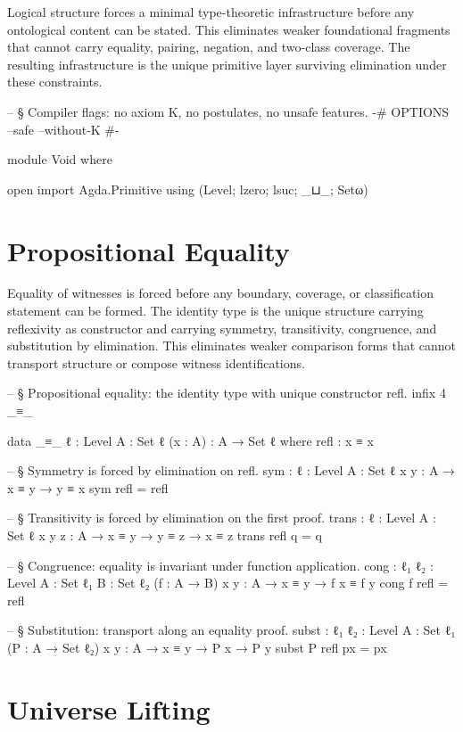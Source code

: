 \documentclass[11pt,a4paper]{book}
\begin{document}
Logical structure forces a minimal type-theoretic infrastructure before any ontological content can be stated.
This eliminates weaker foundational fragments that cannot carry equality, pairing, negation, and two-class coverage.
The resulting infrastructure is the unique primitive layer surviving elimination under these constraints.

\begin{code}
-- § Compiler flags: no axiom K, no postulates, no unsafe features.
{-# OPTIONS --safe --without-K #-}

module Void where

open import Agda.Primitive using (Level; lzero; lsuc; _⊔_; Setω)
\end{code}

\section{Propositional Equality}

Equality of witnesses is forced before any boundary, coverage, or classification statement can be formed.
The identity type is the unique structure carrying reflexivity as constructor and carrying symmetry, transitivity, congruence, and substitution by elimination.
This eliminates weaker comparison forms that cannot transport structure or compose witness identifications.

\begin{code}
-- § Propositional equality: the identity type with unique constructor refl.
infix 4 _≡_

data _≡_ {ℓ : Level} {A : Set ℓ} (x : A) : A → Set ℓ where
  refl : x ≡ x

-- § Symmetry is forced by elimination on refl.
sym : {ℓ : Level} {A : Set ℓ} {x y : A} → x ≡ y → y ≡ x
sym refl = refl

-- § Transitivity is forced by elimination on the first proof.
trans : {ℓ : Level} {A : Set ℓ} {x y z : A} → x ≡ y → y ≡ z → x ≡ z
trans refl q = q

-- § Congruence: equality is invariant under function application.
cong : {ℓ₁ ℓ₂ : Level} {A : Set ℓ₁} {B : Set ℓ₂} (f : A → B) {x y : A} → x ≡ y → f x ≡ f y
cong f refl = refl

-- § Substitution: transport along an equality proof.
subst : {ℓ₁ ℓ₂ : Level} {A : Set ℓ₁} (P : A → Set ℓ₂) {x y : A} → x ≡ y → P x → P y
subst P refl px = px
\end{code}

\section{Universe Lifting}
\end{document}
